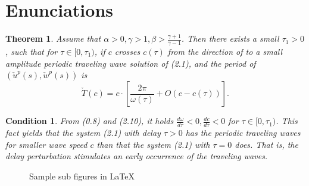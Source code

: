 \documentclass[vruler,JEB]{COB}%
\newtheorem{theorem}{Theorem}
\newtheorem{condition}{Condition}
\begin{document}
\section{Enunciations}





\begin{theorem}\label{T0.1}
Assume that $\alpha>0, \gamma>1, \beta>\frac{\gamma+1}{\gamma-1}$.
Then there exists a small $\tau_1>0$, such that for $\tau\in
[0,\tau_1)$, if $c$ crosses $c(\tau)$ from the direction of
to  a small amplitude periodic traveling wave solution of
(2.1), and the period of $(\check{u}^p(s),\check{w}^p(s))$ is
\[
\check{T}(c)=c\cdot \left[\frac{2\pi}{\omega(\tau)}+O(c-c(\tau))\right].
\]
\end{theorem}


\begin{condition}\label{C2.2}
From (0.8) and (2.10), it holds
$\frac{d\omega}{d\tau}<0,\frac{dc}{d\tau}<0$ for $\tau\in
[0,\tau_1)$. This fact yields that the system (2.1) with delay
$\tau>0$ has the periodic traveling waves for smaller wave speed $c$
than that the system (2.1) with $\tau=0$ does. That is, the
delay perturbation stimulates an early occurrence of the traveling waves.
\end{condition}

\begin{figure}[!t]
\centering
{}%
\hskip3pc
%
\caption[]{Sample sub figures in \LaTeX}
\label{fig_sim}
\end{figure}
\end{document}
